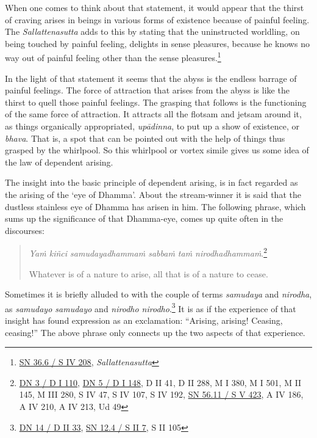 When one comes to think about that statement, it would appear that the thirst of craving arises in beings in various forms of existence because of painful feeling. The \emph{Sallattenasutta} adds to this by stating that the uninstructed worldling, on being touched by painful feeling, delights in sense pleasures, because he knows no way out of painful feeling other than the sense pleasures.\footnote{\href{https://suttacentral.net/sn36.6/pli/ms}{SN 36.6 / S IV 208}, \emph{Sallattenasutta}}

In the light of that statement it seems that the abyss is the endless barrage of painful feelings. The force of attraction that arises from the abyss is like the thirst to quell those painful feelings. The grasping that follows is the functioning of the same force of attraction. It attracts all the flotsam and jetsam around it, as things organically appropriated, \emph{upādinna}, to put up a show of existence, or \emph{bhava}. That is, a spot that can be pointed out with the help of things thus grasped by the whirlpool. So this whirlpool or vortex simile gives us some idea of the law of dependent arising.

The insight into the basic principle of dependent arising, is in fact regarded as the arising of the `eye of Dhamma'. About the stream-winner it is said that the dustless stainless eye of Dhamma has arisen in him. The following phrase, which sums up the significance of that Dhamma-eye, comes up quite often in the discourses:

\begin{quote}
\emph{Yaṁ kiñci samudayadhammaṁ sabbaṁ taṁ nirodhadhammaṁ}.\footnote{\href{https://suttacentral.net/dn3/pli/ms}{DN 3 / D I 110}, \href{https://suttacentral.net/dn5/pli/ms}{DN 5 / D I 148}, D II 41, D II 288, M I 380, M I 501, M II 145, M III 280, S IV 47, S IV 107, S IV 192, \href{https://suttacentral.net/sn56.11/pli/ms}{SN 56.11 / S V 423}, A IV 186, A IV 210, A IV 213, Ud 49}

Whatever is of a nature to arise, all that is of a nature to cease.
\end{quote}

Sometimes it is briefly alluded to with the couple of terms \emph{samudaya} and \emph{nirodha}, as \emph{samudayo samudayo} and \emph{nirodho nirodho}.\footnote{\href{https://suttacentral.net/dn14/pli/ms}{DN 14 / D II 33}, \href{https://suttacentral.net/sn12.4/pli/ms}{SN 12.4 / S II 7}, S II 105} It is as if the experience of that insight has found expression as an exclamation: ``Arising, arising! Ceasing, ceasing!'' The above phrase only connects up the two aspects of that experience.

